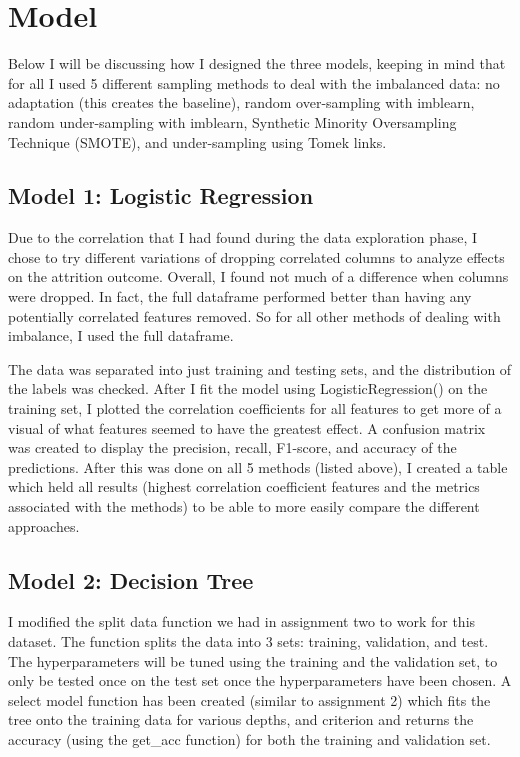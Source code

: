 \documentclass{article}
\begin{document}
\section{Model}
\vspace{-2mm} 
\label{others}
Below I will be discussing how I designed the three models, keeping in mind that for all I used 5 different sampling methods to deal with the imbalanced data: no adaptation (this creates the baseline), random over-sampling with imblearn, random under-sampling with imblearn, Synthetic Minority Oversampling Technique (SMOTE), and under-sampling using Tomek links.

\subsection{Model 1: Logistic Regression}
\vspace{-2mm} %
Due to the correlation that I had found during the data exploration phase, I chose to try different variations of dropping correlated columns to analyze effects on the attrition outcome. Overall, I found not much of a difference when columns were dropped. In fact, the full dataframe performed better than having any potentially correlated features removed. So for all other methods of dealing with imbalance, I used the full dataframe. 

The data was separated into just training and testing sets, and the distribution of the labels was checked. After I fit the model using LogisticRegression() on the training set, I plotted the correlation coefficients for all features to get more of a visual of what features seemed to have the greatest effect. A confusion matrix was created to display the precision, recall, F1-score, and accuracy of the predictions. After this was done on all 5 methods (listed above), I created a table which held all results (highest correlation coefficient features and the metrics associated with the methods) to be able to more easily compare the different approaches. 

\subsection{Model 2: Decision Tree}
\vspace{-2mm} %
I modified the split data function we had in assignment two to work for this dataset. The function splits the data into 3 sets: training, validation, and test. The hyperparameters will be tuned using the training and the validation set, to only be tested once on the test set once the hyperparameters have been chosen. A select model function has been created (similar to assignment 2) which fits the tree onto the training data for various depths, and criterion and returns the accuracy (using the get\_acc function) for both the training and validation set.
\end{document}
